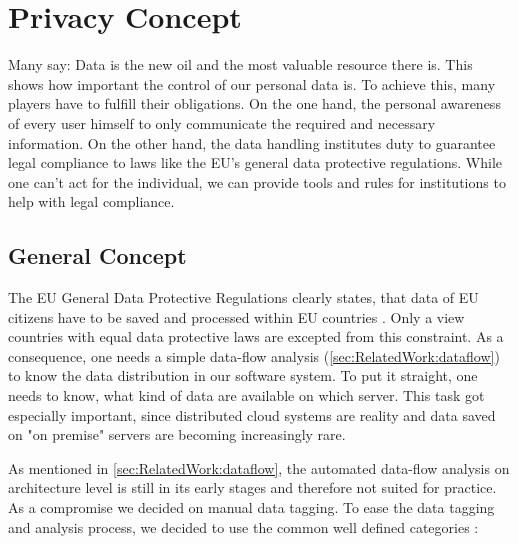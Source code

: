 
\chapter{Privacy Concept}
\label{ch:PrivacyConcept}

Many say: Data is the new oil and the most valuable resource there is. This shows how important the control of our personal data is. To achieve this, many players have to fulfill their obligations. On the one hand, the personal awareness of every user himself to only communicate the required and necessary information. On the other hand, the data handling institutes duty to guarantee legal compliance to laws like the EU’s general data protective regulations. While one can't act for the individual, we can provide tools and rules for institutions to help with legal compliance.

\section{General Concept}
\label{sec:PrivacyConcept:general}

The EU General Data Protective Regulations clearly states, that data of EU citizens have to be saved and processed within EU countries \cite{personaldata.2011}. Only a view countries with equal data protective laws are excepted from this constraint. As a consequence, one needs a simple data-flow analysis (\autoref{sec:RelatedWork:dataflow}) to know the data distribution in our software system. To put it straight, one needs to know, what kind of data are available on which server. This task got especially important, since distributed cloud systems are reality and data saved on "on premise" servers are becoming increasingly rare.

As mentioned in \autoref{sec:RelatedWork:dataflow}, the automated data-flow analysis on architecture level is still in its early stages and therefore not suited for practice. As a compromise we decided on manual data tagging. To ease the data tagging and analysis process, we decided to use the common well defined categories \cite{Schmieders.2015}:

